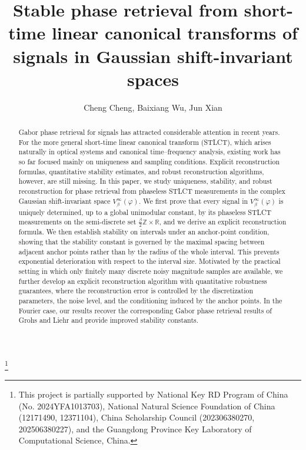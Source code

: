 \documentclass[11pt, reqno]{amsart}
\numberwithin{equation}{section}
\begin{document}
\title[Stable STLCT phase retrieval in Gaussian shift-invariant spaces]{Stable phase retrieval from short-time linear canonical transforms of signals in Gaussian shift-invariant spaces}
\author{Cheng Cheng, Baixiang Wu, Jun Xian}
\thanks{This project is partially supported by  National Key RD Program of China (No. 2024YFA1013703),  National Natural Science Foundation of China (12171490, 12371104), China Scholarship Council (202306380270, 202506380227), and the Guangdong Province Key Laboratory of Computational Science, China.}


\maketitle


\begin{abstract}
Gabor phase retrieval for signals has attracted considerable attention in recent years. For the more general short-time linear canonical transform (STLCT), which arises naturally in optical systems and canonical time--frequency analysis, existing work has so far focused mainly on uniqueness and sampling conditions. Explicit reconstruction formulas, quantitative stability estimates, and robust reconstruction algorithms, however,  are still missing. In this paper, we study uniqueness, stability, and robust reconstruction for phase retrieval from phaseless STLCT measurements in the complex Gaussian shift-invariant space $V_\beta^\infty(\varphi)$.  We first prove that every signal in $V_\beta^\infty(\varphi)$ is uniquely determined, up to a global unimodular constant, by its phaseless STLCT measurements on the semi-discrete set $\frac{\beta}{2}\mathbb Z\times\mathbb R$, and we derive an explicit reconstruction formula. We then establish stability on intervals under an anchor-point condition, showing that the stability constant is governed by the maximal spacing between adjacent anchor points rather than by the radius of the whole interval. This prevents exponential deterioration with respect to the interval size. Motivated by the practical setting in which only finitely many discrete noisy magnitude samples are available, we further develop an explicit reconstruction algorithm with quantitative robustness guarantees, where the reconstruction error is controlled by the discretization parameters, the noise level, and the conditioning induced by the anchor points. In the Fourier case, our results recover the corresponding Gabor phase retrieval results of Grohs and Liehr and provide improved stability constants.
\end{abstract}
\end{document}
